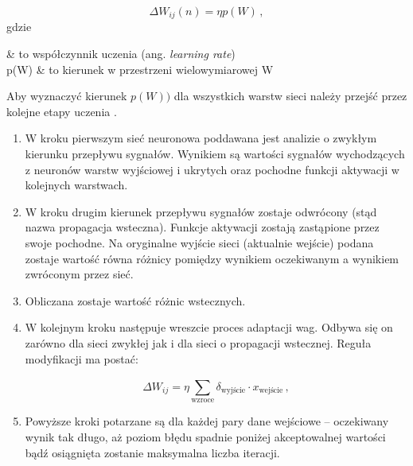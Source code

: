 \documentclass[twoside]{iisthesis}
\begin{document}
 		 
 		 \begin{equation}
 		 \label{eq:weightadaptation2}
 		 \Delta W_{ij}(n) = \eta p(W)
 		 \,,
 		 \end{equation}		 
		 gdzie
		 
		 \begin{conditions*}
		 	\eta & to współczynnik uczenia (ang. \textit{learning rate}) \\
		 	p(W) & to kierunek w przestrzeni wielowymiarowej W 
		 \end{conditions*} 
		 
		 Aby wyznaczyć kierunek $p(W))$ dla wszystkich warstw sieci należy przejść przez kolejne etapy uczenia \cite{haykin1994neural,hertz1993wstkep,kwateralgorytmy,osowski1996sieci,timothy1996sieci}.
		 
		 \begin{enumerate}
		 	\item W kroku pierwszym sieć neuronowa poddawana jest analizie o zwykłym kierunku przepływu sygnałów. Wynikiem są wartości sygnałów wychodzących z neuronów warstw wyjściowej i ukrytych oraz pochodne funkcji aktywacji w kolejnych warstwach. 
		 	
		 	\item W kroku drugim kierunek przepływu sygnałów zostaje odwrócony (stąd nazwa propagacja wsteczna). Funkcje aktywacji zostają zastąpione przez swoje pochodne. Na oryginalne wyjście sieci (aktualnie wejście) podana zostaje wartość równa różnicy pomiędzy wynikiem oczekiwanym a wynikiem zwróconym przez sieć. 
		 	
		 	\item Obliczana zostaje wartość różnic wstecznych.
		 	
			\item W kolejnym kroku następuje wreszcie proces adaptacji wag. Odbywa się on zarówno dla sieci zwykłej jak i dla sieci o propagacji wstecznej. Reguła modyfikacji ma postać: 

			\begin{equation}
				\label{eq:weightadaptation4}
				\Delta W_{ij} = \eta \sum_\text{wzroce}^{} \delta_\text{wyjście} \cdot x_\text{wejście}
				\,,
			\end{equation}
			
			\item Powyższe kroki potarzane są dla każdej pary dane wejściowe -- oczekiwany wynik tak długo, aż poziom błędu spadnie poniżej akceptowalnej wartości bądź osiągnięta zostanie maksymalna liczba iteracji. 

		 \end{enumerate}
				 
\end{document}
